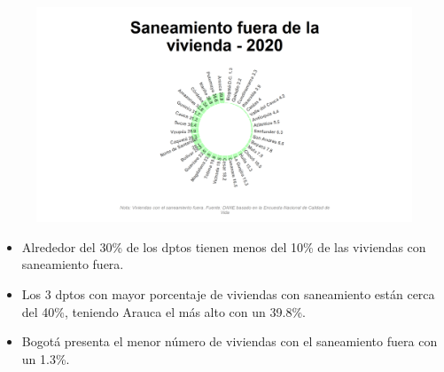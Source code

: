     \begin{figure}[H]
        \caption[Saneamiento fuera de la vivienda por departamentos para 2020 ]{\label{saneamiento_fuera_dptos} }
        \begin{center}
        \includegraphics[width=\textwidth,keepaspectratio]{img/var_195_static.png}
        \end{center}
    \end{figure}
            \begin{itemize}
                    \item Alrededor del 30\% de los dptos tienen menos del 10\% de las viviendas con saneamiento fuera.
                    \item Los 3 dptos con mayor porcentaje de viviendas con saneamiento están cerca del 40\%, teniendo Arauca el más alto con un 39.8\%.
                    \item Bogotá presenta el menor número de viviendas con el saneamiento fuera con un 1.3\%.
                    \end{itemize}

